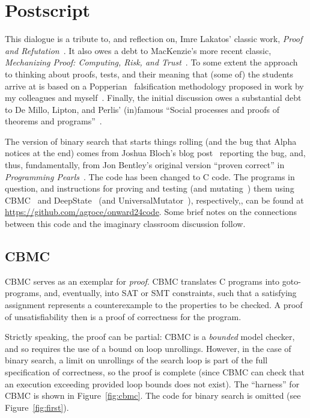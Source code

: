 \documentclass[sigplan]{acmart}
\begin{document}
\FloatBarrier

\section{Postscript}



This dialogue is a tribute to, and reflection on, Imre Lakatos' classic
work, \emph{Proof and Refutation}~\cite{lakatos1963proofs}.  It also
owes a debt to MacKenzie's more recent classic, \emph{Mechanizing
  Proof: Computing, Risk, and Trust}~\cite{mackenzie2004mechanizing}.
To some extent the approach to thinking about proofs, tests, and their
meaning that (some of) the students arrive at is based on a Popperian~\cite{Popper} falsification methodology proposed in
work by my colleagues and
myself~\cite{groce2015verified,groce2018verified}.  Finally, the
initial discussion owes a substantial debt to De Millo, Lipton, and
Perlis' (in)famous ``Social processes and proofs of theorems and programs''~\cite{de1979social}.

The version of binary search that starts things rolling (and the bug
that Alpha notices at the end) comes from Joshua Bloch's blog post~\cite{bloch} reporting
the bug, and, thus, fundamentally, from Jon Bentley's original version ``proven
correct'' in \emph{Programming Pearls}~\cite{Pearls}.  The code has
been changed to C code.  The programs in question, and instructions
for proving and testing (and mutating~\cite{MutationSurvey}) them using CBMC~\cite{CBMCp} and
DeepState~\cite{goodman2018deepstate} (and UniversalMutator~\cite{SyntaxUM}), respectively,, can be found at
\url{https://github.com/agroce/onward24code}.  Some brief notes on the
connections between this code and the imaginary classroom discussion follow.

\subsection{CBMC}


CBMC serves as an exemplar for \emph{proof}.  CBMC
translates C programs into goto-programs, and, eventually, into SAT or
SMT constraints, such that a satisfying assignment represents a
counterexample to the properties to be checked.  A proof of
unsatisfiability then is a proof of correctness for the program.

Strictly speaking, the
proof can be partial: CBMC is a \emph{bounded} model checker, and so
requires the use of a bound on loop unrollings.  However, in the case
of binary search, a limit on unrollings of the search loop is part of
the full specification of correctness, so the proof is complete (since
CBMC can check that an execution exceeding provided loop bounds does
not exist).  The ``harness'' for CBMC is shown in
Figure~\ref{fig:cbmc}.  The code for binary search is omitted (see
Figure~\ref{fig:first}).
\end{document}
